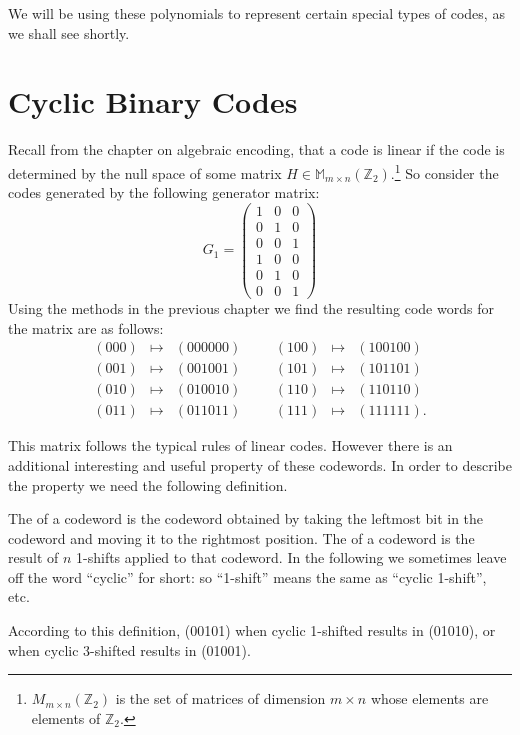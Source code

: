 We will be using these polynomials to represent certain special types of codes, as we shall see shortly.



\section{Cyclic Binary Codes}

  Recall from the chapter on algebraic encoding, that a code is linear if the code is determined by the null space of some matrix $H \in \mathbb{M}_{m\times n}(\mathbb{Z}_2).$\footnote{${M}_{m\times n}(\mathbb{Z}_2)$ is the set of matrices of dimension $m \times n$ whose elements are elements of $\mathbb{Z}_2$.}  So consider the codes generated by the following generator matrix:
\[
G_1 
= 
\begin{pmatrix}
1 & 0 & 0 \\
0 & 1 & 0 \\
0 & 0 & 1 \\
1 & 0 & 0 \\
0 & 1 & 0 \\
0 & 0 & 1 
\end{pmatrix}
\]
Using the methods in the previous chapter we find the resulting code words for the matrix are as follows:
\[
\begin{array}{rclccrcl}
(000) & \mapsto & (000000) & & & (100) & \mapsto & (100100) \\
(001) & \mapsto & (001001) & & & (101) & \mapsto & (101101) \\
(010) & \mapsto & (010010) & & & (110) & \mapsto & (110110) \\
(011) & \mapsto & (011011) & & & (111) & \mapsto & (111111).
\end{array}
\]

This matrix follows the typical rules of linear codes. However there is an additional interesting and useful property of these codewords.  In order to describe the property we need the following definition.

\begin{defn}{}
The   of a codeword is the codeword obtained by taking the leftmost bit in the codeword and moving it to the rightmost position. The   of a codeword is the result of $n$ 1-shifts applied to that codeword. In the following we sometimes leave off the word ``cyclic'' for short: so ``1-shift'' means the same as ``cyclic 1-shift'', etc.
\end {defn}
According to this definition, (00101) when cyclic 1-shifted results in (01010), or when cyclic 3-shifted results in (01001).

